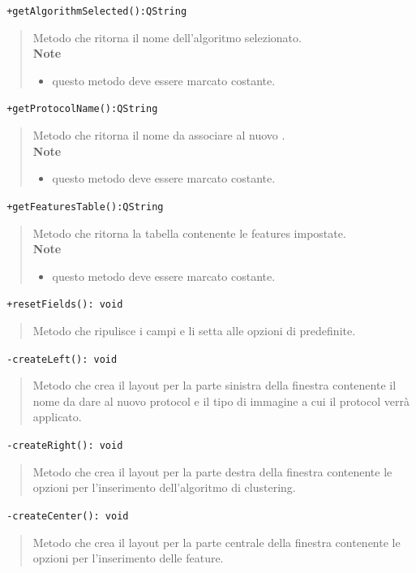 \color{blue}\verb! +getAlgorithmSelected():QString!
\begin{quote}
\color{black} Metodo che ritorna il nome dell'algoritmo selezionato.  \\
 \textbf{Note}
 \begin{itemize}
 \item questo metodo deve essere marcato costante.
 \end{itemize}
\end{quote}
\color{blue}\verb! +getProtocolName():QString!
\begin{quote}
\color{black} Metodo che ritorna il nome da associare al nuovo \protocol{}.  \\
 \textbf{Note}
 \begin{itemize}
 \item questo metodo deve essere marcato costante.
 \end{itemize}
\end{quote}
\color{blue}\verb! +getFeaturesTable():QString!
\begin{quote}
\color{black} Metodo che ritorna la tabella contenente le features impostate.  \\
 \textbf{Note}
 \begin{itemize}
 \item questo metodo deve essere marcato costante.
 \end{itemize}
\end{quote}
\color{blue}\verb! +resetFields(): void!
\begin{quote}
\color{black} Metodo che ripulisce i campi e li setta alle opzioni di predefinite.
\end{quote}
\color{blue}\verb! -createLeft(): void!
\begin{quote}
\color{black} Metodo che crea il layout per la parte sinistra della finestra contenente il nome da dare al nuovo protocol\g{} e il tipo di immagine a cui il protocol\g{} verrà applicato.
\end{quote}
\color{blue}\verb! -createRight(): void!
\begin{quote}
\color{black} Metodo che crea il layout per la parte destra della finestra contenente le opzioni per l'inserimento dell'algoritmo di clustering\g{}.
\end{quote}
\color{blue}\verb! -createCenter(): void!
\begin{quote}
\color{black} Metodo che crea il layout per la parte centrale della finestra contenente le opzioni per l'inserimento delle feature\g{}.
\end{quote}
